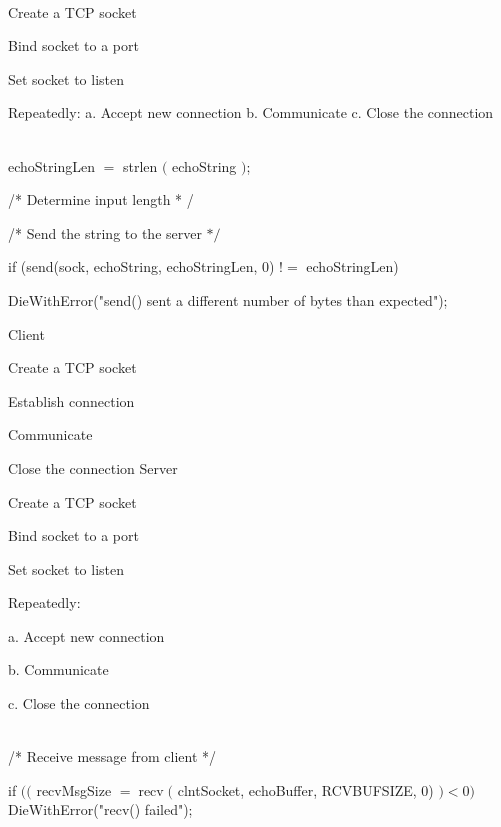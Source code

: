 \begin{description}
\os{\newpage}\item[{\rot\bf  Server }]~\\[-3ex]

Create a TCP socket

Bind socket to a port

Set socket to listen

Repeatedly:
a. Accept new connection
b. Communicate
c. Close the connection


\os{\newpage}\item[{\rot\bf  TCP Client/Server Interaction }]~\\[-3ex]

echoStringLen $=$ strlen $($ echoString $)$;

/* Determine input length * /

/* Send the string to the server $* /$

if (send(sock, echoString, echoStringLen, 0) $!=$ echoStringLen)

DieWithError("send() sent a different number of bytes than expected");

Client

\begin{enumerate}
  \ite Create a TCP socket

  \ite Establish connection

  \ite Communicate

  \ite Close the connection Server

\end{enumerate}

Create a TCP socket

\begin{enumerate}
  \setcounter{enumi}{1}
  \ite Bind socket to a port

  \ite Set socket to listen

  \ite Repeatedly:

\end{enumerate}

a. Accept new connection

b. Communicate

c. Close the connection


\os{\newpage}\item[{\rot\bf  TCP Client/Server Interaction }]~\\[-3ex]

/* Receive message from client */

if $(($ recvMsgSize $=\operatorname{recv}($ clntSocket, echoBuffer, RCVBUFSIZE, 0) $)<0)$ DieWithError("recv() failed");


\end{description}

